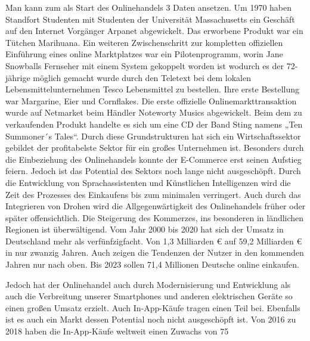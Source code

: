  Man kann zum als Start des Onlinehandels 3 Daten ansetzen. Um 1970 haben Standfort Studenten mit Studenten der Universität Massachusetts ein Geschäft auf den Internet Vorgänger Arpanet abgewickelt. Das erworbene Produkt war ein Tütchen Marihuana. 
Ein weiteren Zwischenschritt zur kompletten offiziellen Einführung eines online Marktplatzes war ein Pilotenprogramm, worin Jane Snowballs Fernseher mit einem System gekoppelt worden ist wodurch es der 72-jährige möglich gemacht wurde durch den Teletext bei dem lokalen Lebensmittelunternehmen Tesco Lebensmittel zu bestellen. Ihre erste Bestellung war Margarine, Eier und Cornflakes. 
Die erste offizielle Onlinemarkttransaktion wurde auf Netmarket beim Händler Noteworty Musics abgewickelt. Beim dem zu verkaufenden Produkt handelte es sich um eine CD der Band Sting namens „Ten Summoner´s Tales“. %
Durch diese Grundstrukturen hat sich ein Wirtschaftssektor gebildet der profitabelste Sektor für ein großes Unternehmen ist. Besonders durch die Einbeziehung des Onlinehandels konnte der E-Commerce erst seinen Aufstieg feiern. Jedoch ist das Potential des Sektors noch lange nicht ausgeschöpft. Durch die Entwicklung von Sprachassistenten und Künstlichen Intelligenzen wird die Zeit des Prozesses des Einkaufens bis zum minimalen verringert. Auch durch das Integrieren von Drohen wird die Allgegenwärtigkeit des Onlinehandels früher oder später offensichtlich. %
Die Steigerung des Kommerzes, ins besonderen in ländlichen Regionen ist überwältigend. Vom Jahr 2000 bis 2020 hat sich der Umsatz in Deutschland mehr als verfünfzigfacht. Von 1,3 Milliarden € auf 59,2 Milliarden € in nur zwanzig Jahren. %
Auch zeigen die Tendenzen der Nutzer in den kommenden Jahren nur nach oben. Bis 2023 sollen 71,4 Millionen Deutsche online einkaufen.       
 
Jedoch hat der Onlinehandel auch durch Modernisierung und Entwicklung als auch die Verbreitung unserer Smartphones und anderen elektrischen Geräte so einen großen Umsatz erzielt. Auch In-App-Käufe tragen einen Teil bei. Ebenfalls ist es auch ein Markt dessen Potential noch nicht ausgeschöpft ist. Von 2016 zu 2018 haben die In-App-Käufe weltweit einen Zuwachs von 75 %
   
